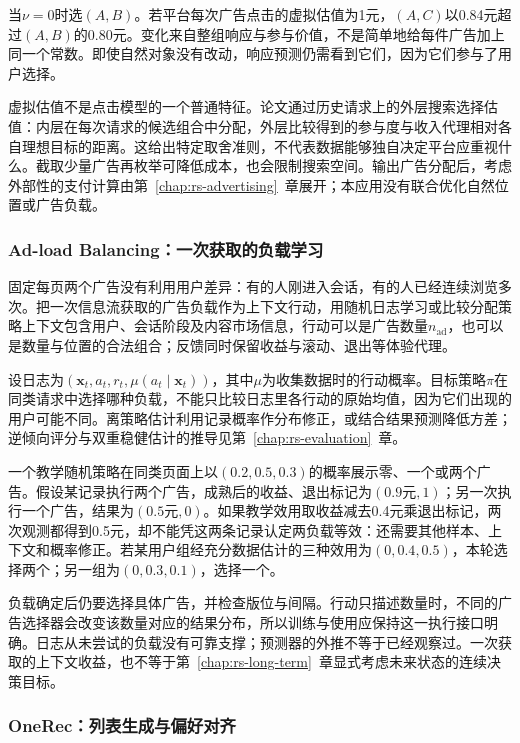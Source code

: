 当$\nu=0$时选$(A,B)$。若平台每次广告点击的虚拟估值为1元，$(A,C)$以0.84元超过$(A,B)$的0.80元。变化来自整组响应与参与价值，不是简单地给每件广告加上同一个常数。即使自然对象没有改动，响应预测仍需看到它们，因为它们参与了用户选择。

虚拟估值不是点击模型的一个普通特征。论文通过历史请求上的外层搜索选择估值：内层在每次请求的候选组合中分配，外层比较得到的参与度与收入代理相对各自理想目标的距离。这给出特定取舍准则，不代表数据能够独自决定平台应重视什么。截取少量广告再枚举可降低成本，也会限制搜索空间。输出广告分配后，考虑外部性的支付计算由第~\ref{chap:rs-advertising}~章展开；本应用没有联合优化自然位置或广告负载。

\subsubsection{Ad-load Balancing：一次获取的负载学习}
\label{sec:rs-ad-load}

固定每页两个广告没有利用用户差异：有的人刚进入会话，有的人已经连续浏览多次。把一次信息流获取的广告负载作为上下文行动，用随机日志学习或比较分配策略上下文包含用户、会话阶段及内容市场信息，行动可以是广告数量$n_{\mathrm{ad}}$，也可以是数量与位置的合法组合；反馈同时保留收益与滚动、退出等体验代理。

设日志为$(\bm x_t,a_t,r_t,\mu(a_t\mid\bm x_t))$，其中$\mu$为收集数据时的行动概率。目标策略$\pi$在同类请求中选择哪种负载，不能只比较日志里各行动的原始均值，因为它们出现的用户可能不同。离策略估计利用记录概率作分布修正，或结合结果预测降低方差；逆倾向评分与双重稳健估计的推导见第~\ref{chap:rs-evaluation}~章。

一个教学随机策略在同类页面上以$(0.2,0.5,0.3)$的概率展示零、一个或两个广告。假设某记录执行两个广告，成熟后的收益、退出标记为$(0.9\text{元},1)$；另一次执行一个广告，结果为$(0.5\text{元},0)$。如果教学效用取收益减去0.4元乘退出标记，两次观测都得到0.5元，却不能凭这两条记录认定两负载等效：还需要其他样本、上下文和概率修正。若某用户组经充分数据估计的三种效用为$(0,0.4,0.5)$，本轮选择两个；另一组为$(0,0.3,0.1)$，选择一个。

负载确定后仍要选择具体广告，并检查版位与间隔。行动只描述数量时，不同的广告选择器会改变该数量对应的结果分布，所以训练与使用应保持这一执行接口明确。日志从未尝试的负载没有可靠支撑；预测器的外推不等于已经观察过。一次获取的上下文收益，也不等于第~\ref{chap:rs-long-term}~章显式考虑未来状态的连续决策目标。

\subsubsection{OneRec：列表生成与偏好对齐}
\label{sec:rs-onerec}

